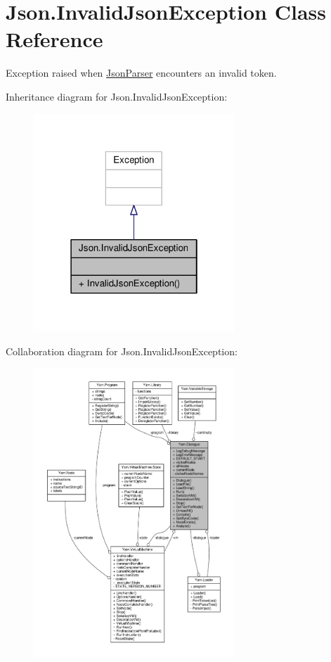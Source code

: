 \hypertarget{a00059}{\section{Json.\-Invalid\-Json\-Exception Class Reference}
\label{a00059}
}


Exception raised when \hyperlink{a00060}{Json\-Parser} encounters an invalid token.  




Inheritance diagram for Json.\-Invalid\-Json\-Exception\-:
\nopagebreak
\begin{figure}[H]
\begin{center}
\leavevmode
\includegraphics[width=214pt]{a00207}
\end{center}
\end{figure}


Collaboration diagram for Json.\-Invalid\-Json\-Exception\-:
\nopagebreak
\begin{figure}[H]
\begin{center}
\leavevmode
\includegraphics[width=214pt]{a00208}
\end{center}
\end{figure}
